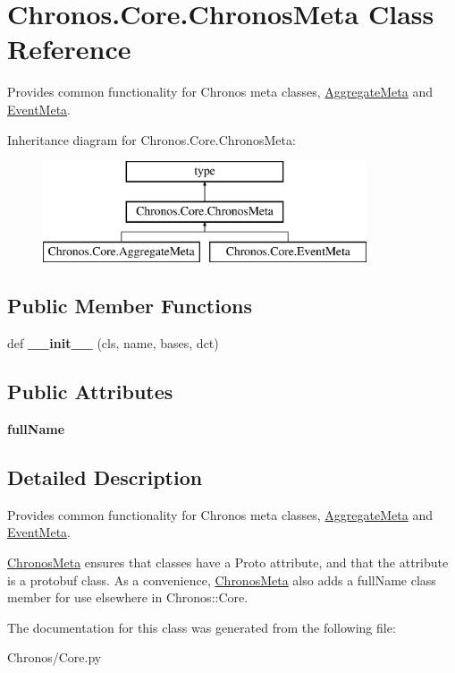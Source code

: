 \hypertarget{classChronos_1_1Core_1_1ChronosMeta}{}\section{Chronos.\+Core.\+Chronos\+Meta Class Reference}
\label{classChronos_1_1Core_1_1ChronosMeta}


Provides common functionality for Chronos meta classes, \hyperlink{classChronos_1_1Core_1_1AggregateMeta}{Aggregate\+Meta} and \hyperlink{classChronos_1_1Core_1_1EventMeta}{Event\+Meta}.  


Inheritance diagram for Chronos.\+Core.\+Chronos\+Meta\+:\begin{figure}[H]
\begin{center}
\leavevmode
\includegraphics[height=3.000000cm]{classChronos_1_1Core_1_1ChronosMeta}
\end{center}
\end{figure}
\subsection*{Public Member Functions}
\begin{DoxyCompactItemize}
\item 
def {\bfseries \+\_\+\+\_\+init\+\_\+\+\_\+} (cls, name, bases, dct)
\end{DoxyCompactItemize}
\subsection*{Public Attributes}
\begin{DoxyCompactItemize}
\item 
{\bfseries full\+Name}
\end{DoxyCompactItemize}


\subsection{Detailed Description}
Provides common functionality for Chronos meta classes, \hyperlink{classChronos_1_1Core_1_1AggregateMeta}{Aggregate\+Meta} and \hyperlink{classChronos_1_1Core_1_1EventMeta}{Event\+Meta}. 

\hyperlink{classChronos_1_1Core_1_1ChronosMeta}{Chronos\+Meta} ensures that classes have a \textquotesingle{}Proto\textquotesingle{} attribute, and that the attribute is a protobuf class. As a convenience, \hyperlink{classChronos_1_1Core_1_1ChronosMeta}{Chronos\+Meta} also adds a \textquotesingle{}full\+Name\textquotesingle{} class member for use elsewhere in Chronos\+::\+Core. 

The documentation for this class was generated from the following file\+:\begin{DoxyCompactItemize}
\item 
Chronos/Core.\+py\end{DoxyCompactItemize}
